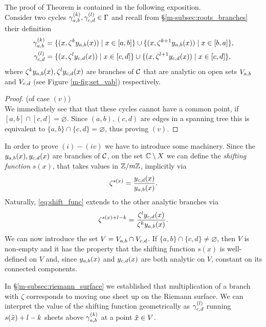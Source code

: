 \documentclass[main.tex]{subfiles}
\begin{document}
 \bigskip
 The proof of Theorem is contained in the following exposition. \\ 
  Consider
  two cycles $\gamma_{a,b}^{(k)},\gamma_{c,d}^{(l)} \in \Gamma$ and
  recall from \S \ref{m-subsec:roots_branches} their definition 
   \begin{align}\label{eq:def_cyabk}
      \gamma_{a,b}^{(k)} & = \{  (x,\zeta^k y_{a,b}(x))  \mid  x \in [a,b]  \} \cup \{  (x,\zeta^{k+1} y_{a,b}(x))  \mid  x \in [b,a]  \}, \\
      \gamma_{c,d}^{(l)} & = \{  (x,\zeta^l y_{c,d}(x))  \mid  x \in [c,d]  \} \cup \{  (x,\zeta^{l+1} y_{c,d}(x))  \mid  x \in [c,d]  \},
   \end{align}
  where $\zeta^ky_{a,b}(x),\zeta^ly_{c,d}(x)$ are branches of $\mathcal{C}$ that are analytic on open sets $V_{a,b}$ and $V_{c,d}$ 
  (see Figure \ref{m-fig:set_vab}) respectively.
  \begin{proof}\let\qed\relax (of case $(v)$) \\
  We immediately see that that these cycles cannot have a common point, if $[a,b] \cap [c,d] = \varnothing$. Since
  $(a,b),(c,d)$ are edges in a spanning tree this is equivalent to $\{a,b\} \cap \{c,d\} = \varnothing$, thus
  proving $(v)$.
  \end{proof}
   In order to prove $(i)-(iv)$ we have to introduce some machinery. Since the $y_{a,b}(x),y_{c,d}(x)$ are branches of $\mathcal{C}$,
   on the set $\mathbb{C} \setminus X$
   we can define the \emph{shifting function}
   $s(x)$, that takes values in $\mathbb{Z}/m\mathbb{Z}$, implicitly via
  \begin{equation}\label{eq:shift_func}
   \zeta^{s(x)} = \frac{y_{c,d}(x)}{y_{a,b}(x)}.
   \end{equation}
  Naturally, \eqref{eq:shift_func} extends to the other analytic branches via
  \begin{equation}
   \zeta^{s(x)+l-k} = \frac{\zeta^ly_{c,d}(x)}{\zeta^ky_{a,b}(x)}.
   \end{equation}
   We can now introduce the set $V = V_{a,b} \cap V_{c,d}$. If $\{a,b\} \cap \{c,d\} \ne \varnothing$, then $V$ is non-empty
  and it has the property that the shifting function $s(x)$ is well-defined on $V$ and, since $y_{a,b}(x)$ and $y_{c,d}(x)$ are 
  both analytic on $V$, constant on its 
  connected components.
  
  In \S \ref{m-subsec:riemann_surface} we established that multiplication of a branch with $\zeta$ corresponds to moving
  one sheet up on the Riemann surface.
  We can interpret the value of the shifting function geometrically as
  $\gamma_{c,d}^{(l)}$ running $s(\tilde{x})+l-k$ sheets above $\gamma_{a,b}^{(k)}$ at a point $\tilde{x} \in V$.
  
\end{document}

